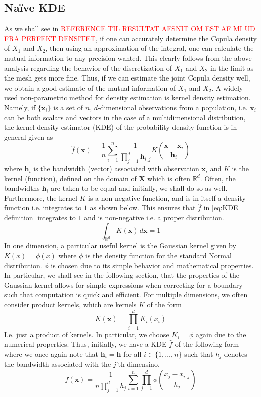 \documentclass[../Thesis.tex]{subfiles}
\begin{document}
\subsection{Naïve KDE}
As we shall see in \textcolor{red}{REFERENCE TIL RESULTAT AFSNIT OM EST AF MI UD FRA PERFEKT DENSITET}, if one can accurately determine the Copula density of $X_1$ and $X_2$, then using an approximation of the integral, one can calculate the mutual information to any precision wanted. This clearly follows from the above analysis regarding the behavior of the discretization of $X_1$ and $X_2$ in the limit as the mesh gets more fine. Thus, if we can estimate the joint Copula density well, we obtain a good estimate of the mutual information of $X_1$ and $X_2$. A widely used non-parametric method for density estimation is kernel density estimation. Namely, if $\{{\boldsymbol x}_i\}$ is a set of $n$, $d$-dimensional observations from a population, i.e. $\boldsymbol x_i$ can be both scalars and vectors in the case of a multidimensional distribution, the kernel density estimator (KDE) of the probability density function is in general given as
\begin{equation}\label{eq:KDE definition}
    \hat{f}(\boldsymbol x) = \frac{1}{n}\sum_{i=1}^n \frac{1}{\prod_{j= 1}^d \boldsymbol h_{i,j}} K\left(\frac{\boldsymbol x-\boldsymbol x_i}{\boldsymbol h_i}\right)
\end{equation}
where $\boldsymbol h_i$ is the bandwidth (vector) associated with observation $\boldsymbol x_i$ and $K$ is the kernel (function), defined on the domain of $\boldsymbol X$ which is often $\mathbb{R}^d$. Often, the bandwidths $\boldsymbol h_i$ are taken to be equal and initially, we shall do so as well. Furthermore, the kernel $K$ is a non-negative function, and is in itself a density function i.e. integrates to $1$ as shown below. This ensures that $\hat{f}$ in \autoref{eq:KDE definition} integrates to $1$ and is non-negative i.e. a proper distribution.
$$\int_{\mathbb{R}^d} K(\boldsymbol x) \, d\boldsymbol x = 1$$
In one dimension, a particular useful kernel is the Gaussian kernel given by $K(x) = \phi\left(x\right)$ where $\phi$ is the density function for the standard Normal distribution. $\phi$ is chosen due to its simple behavior and mathematical properties. In particular, we shall see in the following section, that the properties of the Gaussian kernel allows for simple expressions when correcting for a boundary such that computation is quick and efficient. For multiple dimensions, we often consider product kernels, which are kernels $K$ of the form
\begin{equation}\label{eq:product kernel}
    K\left(\boldsymbol x\right) = \prod_{i = 1}^{d} K_i\left(x_i\right)
\end{equation}
I.e. just a product of kernels. In particular, we choose $K_i = \phi$ again due to the numerical properties. Thus, initially, we have a KDE $\hat{f}$ of the following form where we once again note that $\boldsymbol h_i = \boldsymbol h$ for all $i\in \{1,\dots, n\}$ such that $h_j$ denotes the bandwidth associated with the $j$'th dimensino.
$$\hat{f}\left(\boldsymbol x\right) = \frac{1}{n\prod_{j = 1}^{d}h_j} \sum_{i=1}^n \prod_{j = 1}^{d} \phi \left(\frac{x_j - x_{i,j}}{h_j}\right)$$
\end{document}

